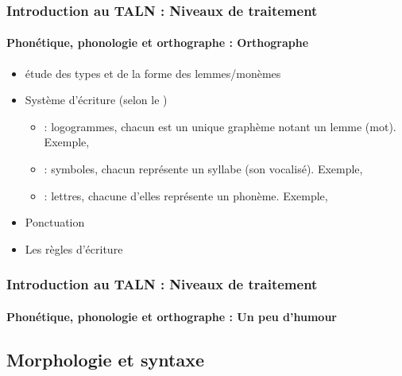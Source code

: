 \documentclass[xcolor=table]{beamer}
\begin{document}
\begin{frame}
\frametitle{Introduction au TALN : Niveaux de traitement}
\framesubtitle{Phonétique, phonologie et orthographe : Orthographe}

\begin{itemize}
	\item étude des types et de la forme des lemmes/monèmes 
	\item Système d'écriture (selon le )
	\begin{itemize}
		\item {} : logogrammes, chacun est un unique graphème notant un lemme (mot).
		Exemple, 
		\item {} : symboles, chacun représente un syllabe (son vocalisé). 
		Exemple, 
		\item {} : lettres, chacune d'elles représente un phonème. 
		Exemple, 
	\end{itemize}
	\item Ponctuation 
	\item Les règles d'écriture 
\end{itemize}

\end{frame}

\begin{frame}
\frametitle{Introduction au TALN : Niveaux de traitement}
\framesubtitle{Phonétique, phonologie et orthographe : Un peu d'humour}

\begin{center}
\end{center}

\end{frame}

\subsection{Morphologie et syntaxe}
\end{document}

